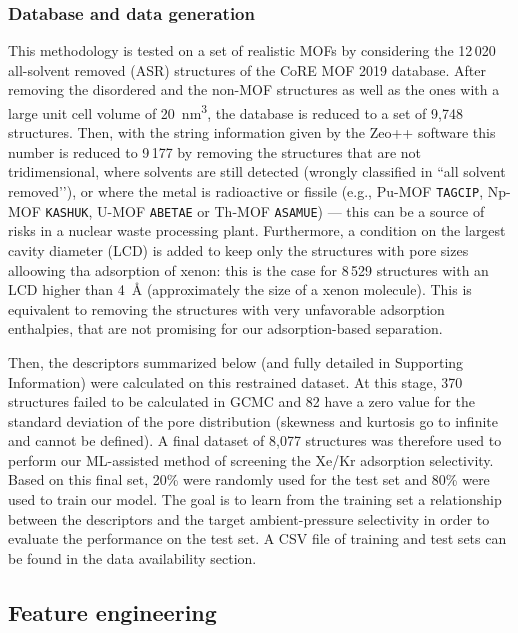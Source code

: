 \documentclass[main]{subfiles}
\begin{document}
\subsubsection{Database and data generation}

This methodology is tested on a set of realistic MOFs by considering the 12\,020 all-solvent removed (ASR) structures of the CoRE MOF 2019 database\autocite{Chung_2019}. After removing the disordered and the non-MOF structures as well as the ones with a large unit cell volume of \SI{20}{\cubic\nano\meter}, the database is reduced to a set of 9,748 structures. Then, with the string information given by the Zeo++ software\autocite{zeopp_Willems2012} this number is reduced to 9\,177 by removing the structures that are not tridimensional, where solvents are still detected (wrongly classified in ``all solvent removed’’), or where the metal is radioactive or fissile (e.g., Pu-MOF \texttt{TAGCIP}\autocite{Diwu_2010}, Np-MOF \texttt{KASHUK}\autocite{Martin_2017}, U-MOF \texttt{ABETAE}\autocite{Jouffret_2011} or Th-MOF \texttt{ASAMUE}\autocite{Liang_2016}) --- this can be a source of risks in a nuclear waste processing plant. Furthermore, a condition on the largest cavity diameter (LCD) is added to keep only the structures with pore sizes alloowing tha adsorption of xenon: this is the case for 8\,529 structures with an LCD higher than \SI{4}{\angstrom} (approximately the size of a xenon molecule). This is equivalent to removing the structures with very unfavorable adsorption enthalpies, that are not promising for our adsorption-based separation.

Then, the descriptors summarized below (and fully detailed in Supporting Information) were calculated on this restrained dataset. At this stage, 370 structures failed to be calculated in GCMC and 82 have a zero value for the standard deviation of the pore distribution (skewness and kurtosis go to infinite and cannot be defined). A final dataset of 8,077 structures was therefore used to perform our ML-assisted method of screening the Xe/Kr adsorption selectivity. Based on this final set, {20\%} were randomly used for the test set and {80\%} were used to train our model. The goal is to learn from the training set a relationship between the descriptors and the target ambient-pressure selectivity in order to evaluate the performance on the test set. A CSV file of training and test sets can be found in the data availability section.

\subsection{Feature engineering}
\end{document}
